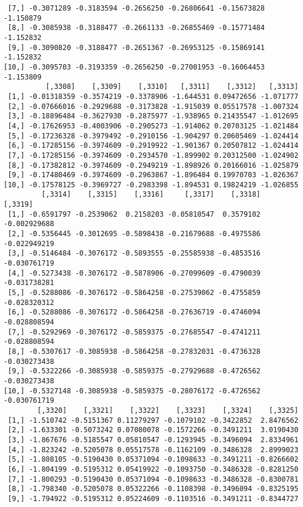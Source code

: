 \documentclass[
  letterpaper,
  DIV=11,
  numbers=noendperiod]{scrreprt}
\begin{document}
\begin{verbatim}
 [7,] -0.3071289 -0.3183594 -0.2656250 -0.26806641 -0.15673828 -1.150879
 [8,] -0.3085938 -0.3188477 -0.2661133 -0.26855469 -0.15771484 -1.152832
 [9,] -0.3090820 -0.3188477 -0.2651367 -0.26953125 -0.15869141 -1.152832
[10,] -0.3095703 -0.3193359 -0.2656250 -0.27001953 -0.16064453 -1.153809
          [,3308]    [,3309]    [,3310]   [,3311]    [,3312]   [,3313]
 [1,] -0.01318359 -0.3574219 -0.3378906 -1.644531 0.09472656 -1.071777
 [2,] -0.07666016 -0.2929688 -0.3173828 -1.915039 0.05517578 -1.007324
 [3,] -0.18896484 -0.3627930 -0.2875977 -1.938965 0.21435547 -1.012695
 [4,] -0.17626953 -0.4003906 -0.2905273 -1.914062 0.20703125 -1.021484
 [5,] -0.17236328 -0.3979492 -0.2910156 -1.904297 0.20605469 -1.024414
 [6,] -0.17285156 -0.3974609 -0.2919922 -1.901367 0.20507812 -1.024414
 [7,] -0.17285156 -0.3974609 -0.2934570 -1.899902 0.20312500 -1.024902
 [8,] -0.17382812 -0.3974609 -0.2949219 -1.898926 0.20166016 -1.025879
 [9,] -0.17480469 -0.3974609 -0.2963867 -1.896484 0.19970703 -1.026367
[10,] -0.17578125 -0.3969727 -0.2983398 -1.894531 0.19824219 -1.026855
         [,3314]    [,3315]    [,3316]     [,3317]    [,3318]      [,3319]
 [1,] -0.6591797 -0.2539062  0.2158203 -0.05810547  0.3579102 -0.002929688
 [2,] -0.5356445 -0.3012695 -0.5898438 -0.21679688 -0.4975586 -0.022949219
 [3,] -0.5146484 -0.3076172 -0.5893555 -0.25585938 -0.4853516 -0.030761719
 [4,] -0.5273438 -0.3076172 -0.5878906 -0.27099609 -0.4790039 -0.031738281
 [5,] -0.5288086 -0.3076172 -0.5864258 -0.27539062 -0.4755859 -0.028320312
 [6,] -0.5288086 -0.3076172 -0.5864258 -0.27636719 -0.4746094 -0.028808594
 [7,] -0.5292969 -0.3076172 -0.5859375 -0.27685547 -0.4741211 -0.028808594
 [8,] -0.5307617 -0.3085938 -0.5864258 -0.27832031 -0.4736328 -0.030273438
 [9,] -0.5322266 -0.3085938 -0.5859375 -0.27929688 -0.4726562 -0.030273438
[10,] -0.5327148 -0.3085938 -0.5859375 -0.28076172 -0.4726562 -0.030761719
        [,3320]    [,3321]    [,3322]    [,3323]    [,3324]    [,3325]
 [1,] -1.510742 -0.5151367 0.11279297 -0.1079102 -0.3422852  2.8476562
 [2,] -1.633301 -0.5073242 0.07080078 -0.1572266 -0.3491211  3.0190430
 [3,] -1.867676 -0.5185547 0.05810547 -0.1293945 -0.3496094  2.8334961
 [4,] -1.823242 -0.5205078 0.05517578 -0.1162109 -0.3486328  2.8999023
 [5,] -1.808105 -0.5190430 0.05371094 -0.1098633 -0.3491211 -0.8266602
 [6,] -1.804199 -0.5195312 0.05419922 -0.1093750 -0.3486328 -0.8281250
 [7,] -1.800293 -0.5190430 0.05371094 -0.1098633 -0.3486328 -0.8300781
 [8,] -1.798340 -0.5205078 0.05322266 -0.1108398 -0.3496094 -0.8325195
 [9,] -1.794922 -0.5195312 0.05224609 -0.1103516 -0.3491211 -0.8344727

\end{verbatim}
\end{document}
